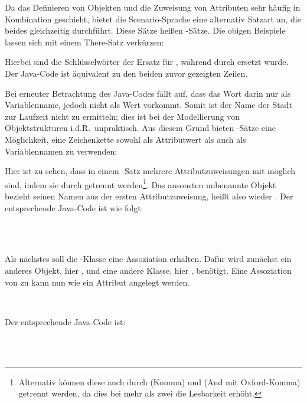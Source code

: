 Da das Definieren von Objekten und die Zuweisung von Attributen sehr häufig in Kombination geschieht, bietet die Scenario-Sprache eine alternativ Satzart an, die beides gleichzeitig durchführt.
Diese Sätze heißen -Sätze.
Die obigen Beispiele lassen sich mit einem There-Satz verkürzen:


Hierbei sind die Schlüsselwörter  der Ersatz für ,
während  durch  ersetzt wurde.
Der Java-Code ist äquivalent zu den beiden zuvor gezeigten Zeilen.

Bei erneuter Betrachtung des Java-Codes fällt auf, dass das Wort  darin nur als Variablenname, jedoch nicht als Wert vorkommt.
Somit ist der Name der Stadt zur Laufzeit nicht zu ermitteln;
dies ist bei der Modellierung von Objektstrukturen i.d.R.\ unpraktisch.
Aus diesem Grund bieten -Sätze eine Möglichkeit, eine Zeichenkette sowohl als Attributwert als auch als Variablennamen zu verwenden:


Hier ist zu sehen, dass in einem -Satz mehrere Attributzuweisungen mit  möglich sind, indem sie durch  getrennt werden\footnote{
Alternativ können diese auch durch \code{,} (Komma) und  (And mit Oxford-Komma) getrennt werden, da dies bei mehr als zwei  die Lesbarkeit erhöht.
}.
Das ansonsten unbenannte Objekt bezieht seinen Namen aus der ersten Attributzuweisung,
heißt also wieder .
Der entsprechende Java-Code ist wie folgt:

\\
\\

Als nächstes soll die -Klasse eine Assoziation erhalten.
Dafür wird zunächst ein anderes Objekt, hier , und eine andere Klasse, hier , benötigt.
Eine Assoziation von  zu  kann nun wie ein Attribut angelegt werden.

\\

Der entsprechende Java-Code ist:

\\
\\

